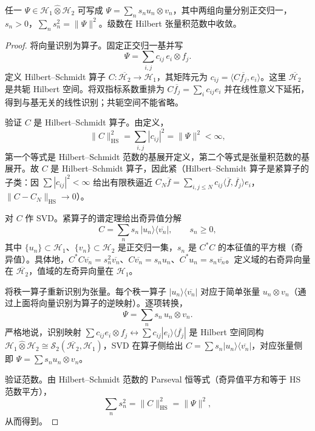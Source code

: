 \begin{theorem}
任一 $\Psi\in\mathcal H_1\widehat\otimes\mathcal H_2$ 可写成 $\Psi=\sum_n s_nu_n\otimes v_n$，其中两组向量分别正交归一，$s_n>0$，$\sum_ns_n^2=\|\Psi\|^2$。级数在 Hilbert 张量积范数中收敛。
\end{theorem}
\begin{proof}
将向量识别为算子。固定正交归一基并写
\begin{equation*}
 \Psi=\sum_{i,j}c_{ij}\,e_i\otimes f_j.
\end{equation*}
定义 Hilbert--Schmidt 算子 $C:\overline{\mathcal H_2}\to\mathcal H_1$，其矩阵元为 $c_{ij}=\langle C\overline{f_j},e_i\rangle$。这里 $\overline{\mathcal H_2}$ 是共轭 Hilbert 空间。将双指标系数重排为 $C\overline{f_j}=\sum_i c_{ij}e_i$ 并在线性意义下延拓，得到与基无关的线性识别；共轭空间不能省略。

验证 $C$ 是 Hilbert--Schmidt 算子。由定义，
\begin{equation*}
 \|C\|_{\mathrm{HS}}^2
 =\sum_{i,j}|c_{ij}|^2
 =\|\Psi\|^2<\infty,
\end{equation*}
第一个等式是 Hilbert--Schmidt 范数的基展开定义，第二个等式是张量积范数的基展开。故 $C$ 是 Hilbert--Schmidt 算子，因此紧（Hilbert--Schmidt 算子是紧算子的子类：因 $\sum|c_{ij}|^2<\infty$ 给出有限秩逼近 $C_N\overline f=\sum_{i,j\le N}c_{ij}\langle\overline f,\overline{f_j}\rangle e_i$，$\|C-C_N\|_{\mathrm{HS}}\to0$）。

对 $C$ 作 SVD。紧算子的谱定理给出奇异值分解
\begin{equation*}
 C=\sum_n s_n\,|u_n\rangle\langle\overline{v_n}|,
 \qquad s_n\ge0,
\end{equation*}
其中 $\{u_n\}\subset\mathcal H_1$、$\{v_n\}\subset\mathcal H_2$ 是正交归一集，$s_n$ 是 $C^*C$ 的本征值的平方根（奇异值）。具体地，$C^*C\overline{v_n}=s_n^2\overline{v_n}$、$C\overline{v_n}=s_nu_n$、$C^*u_n=s_n\overline{v_n}$。定义域的右奇异向量在 $\overline{\mathcal H_2}$，值域的左奇异向量在 $\mathcal H_1$。

将秩一算子重新识别为张量。每个秩一算子 $|u_n\rangle\langle\overline{v_n}|$ 对应于简单张量 $u_n\otimes v_n$（通过上面将向量识别为算子的逆映射）。逐项转换，
\begin{equation*}
 \Psi=\sum_n s_n\,u_n\otimes v_n.
\end{equation*}
严格地说，识别映射 $\sum c_{ij}e_i\otimes f_j\leftrightarrow\sum c_{ij}|e_i\rangle\langle\overline{f_j}|$ 是 Hilbert 空间同构 $\mathcal H_1\widehat\otimes\mathcal H_2\cong\mathcal S_2(\overline{\mathcal H_2},\mathcal H_1)$，SVD 在算子侧给出 $C=\sum s_n|u_n\rangle\langle\overline{v_n}|$，对应张量侧即 $\Psi=\sum s_n u_n\otimes v_n$。

验证范数。由 Hilbert--Schmidt 范数的 Parseval 恒等式（奇异值平方和等于 HS 范数平方），
\begin{equation*}
 \sum_n s_n^2
 =\|C\|_{\mathrm{HS}}^2
 =\|\Psi\|^2,
\end{equation*}
从而得到。
\end{proof}


